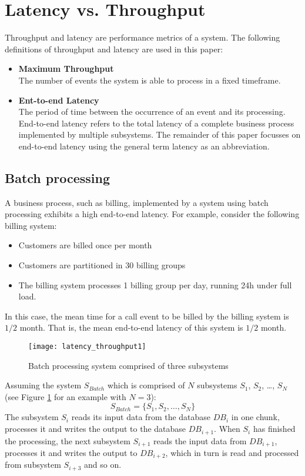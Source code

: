 \section{Latency vs. Throughput}\label{sec:ch2_latency_throughput}
Throughput and latency are performance metrics of a system. The following definitions of throughput and latency are used in this paper:
\begin{itemize}
	\item \textbf{Maximum Throughput}\\
	The number of events the system is able to process in a fixed timeframe.
 	\item \textbf{Ent-to-end Latency}\\
	The period of time between the occurrence of an event and its processing. End-to-end latency refers to the total latency of a complete business process implemented by multiple subsystems. The remainder of this paper focusses on end-to-end latency using the general term latency as an abbreviation.
\end{itemize}
\subsection{Batch processing}
A business process, such as billing, implemented by a system using batch processing exhibits a high end-to-end latency. For example, consider the following billing system:
\begin{itemize}
	\item Customers are billed once per month
	\item Customers are partitioned in 30 billing groups
	\item The billing system processes 1 billing group per day, running 24h under full load.
\end{itemize}

In this case, the mean time for a call event to be billed by the billing system is $1/2$ month. That is, the mean end-to-end latency of this system is $1/2$ month.

\begin{figure}[h!]
	\centering
	\texttt{[image: latency\_throughput1]}
	\caption{Batch processing system comprised of three subsystems}
	\label{fig:batch_processing_latency}
\end{figure}

Assuming the system $S_{Batch}$ which is comprised of $N$ subsystems $S_1$, $S_2$, \ldots, $S_N$ (see Figure \ref{fig:batch_processing_latency} for an example with $N=3$):
\begin{displaymath}
S_{Batch} = \{S_1, S_2, \ldots, S_N\}
\end{displaymath}
The subsystem $S_i$ reads its input data from the database $DB_i$ in one chunk, processes it and writes the output to the database $DB_{i+1}$. When $S_i$ has finished the processing, the next subsystem $S_{i+1}$ reads the input data from $DB_{i+1}$, processes it and writes the output to $DB_{i+2}$, which in turn is read and processed from subsystem $S_{i+3}$ and so on.

